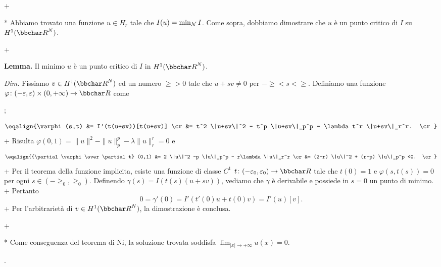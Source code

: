   \pg+
  
  * Abbiamo trovato una funzione $u \in H_r$ tale che $I(u) = \min_{\cal N} I$. Come sopra, dobbiamo dimostrare che $u$ \`e un punto critico di $I$ su $H^1(\R^N)$.
  
  \pg+
  
  {\bf Lemma.} Il minimo $u$ \`e un punto critico di $I$ in $H^1(\R^N)$.
  
  {\em Dim.} Fissiamo $v \in H^1(\R^N)$ ed un numero $\ge>0$ tale che $u+sv \neq 0$ per $-\ge<s<\ge$. Definiamo una funzione $\varphi \colon (-\ge,\ge) \times (0,+\infty) \to \R$ come
 
 \pg;
 
 $$
 \eqalign{%
 \varphi(s,t) &=  I'(t(u+sv))[t(u+sv)] \cr
 &= t^2 \|u+sv\|^2 - t^p \|u+sv\|_p^p - \lambda t^r \|u+sv\|_r^r. \cr
 }
 $$
 \pg+
 Risulta $\varphi(0,1)=\|u\|^2 - \|u\|_p^p - \lambda \|u\|_r^r=0$ e
 $$
 \eqalign{%
 {\partial \varphi \over \partial t} (0,1) &=  2 \|u\|^2 -p \|u\|_p^p - r\lambda \|u\|_r^r \cr
 &= (2-r) \|u\|^2 + (r-p) \|u\|_p^p <0. \cr
 }
 $$
 \pg+
 Per il teorema della funzione implicita, esiste una funzione di classe $C^1$ $t \colon (-\ge_0,\ge_0) \to \R$ tale che $t(0)=1$ e $\varphi(s,t(s))=0$ per ogni $s \in (-\ge_0,\ge_0)$. Definendo $\gamma(s) = I(t(s)(u+sv))$, vediamo che $\gamma$ \`e derivabile e possiede in $s=0$ un punto di minimo.
 \pg+
 Pertanto
 $$
0= \gamma'(0)= I'(t'(0)u+t(0)v) = I'(u)[v].
$$
\pg+
Per l'arbitrariet\`a di $v \in H^1(\R^N)$, la dimostrazione \`e conclusa.

\pg+

* Come conseguenza del teorema di Ni, la soluzione trovata soddisfa $\lim_{|x| \to +\infty} u(x) =0$.











\pg. %
